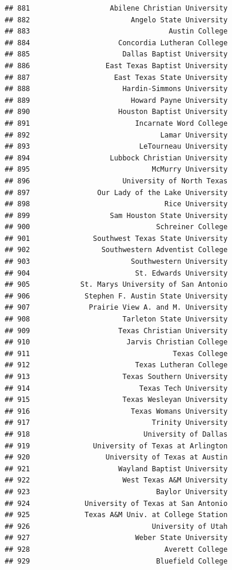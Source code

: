 \documentclass[]{article}
\begin{document}
\begin{verbatim}
## 881                   Abilene Christian University
## 882                        Angelo State University
## 883                                 Austin College
## 884                     Concordia Lutheran College
## 885                      Dallas Baptist University
## 886                  East Texas Baptist University
## 887                    East Texas State University
## 888                      Hardin-Simmons University
## 889                        Howard Payne University
## 890                     Houston Baptist University
## 891                         Incarnate Word College
## 892                               Lamar University
## 893                          LeTourneau University
## 894                   Lubbock Christian University
## 895                             McMurry University
## 896                      University of North Texas
## 897                Our Lady of the Lake University
## 898                                Rice University
## 899                   Sam Houston State University
## 900                              Schreiner College
## 901               Southwest Texas State University
## 902                 Southwestern Adventist College
## 903                        Southwestern University
## 904                         St. Edwards University
## 905            St. Marys University of San Antonio
## 906             Stephen F. Austin State University
## 907              Prairie View A. and M. University
## 908                      Tarleton State University
## 909                     Texas Christian University
## 910                       Jarvis Christian College
## 911                                  Texas College
## 912                         Texas Lutheran College
## 913                      Texas Southern University
## 914                          Texas Tech University
## 915                      Texas Wesleyan University
## 916                        Texas Womans University
## 917                             Trinity University
## 918                           University of Dallas
## 919               University of Texas at Arlington
## 920                  University of Texas at Austin
## 921                     Wayland Baptist University
## 922                      West Texas A&M University
## 923                              Baylor University
## 924             University of Texas at San Antonio
## 925             Texas A&M Univ. at College Station
## 926                             University of Utah
## 927                         Weber State University
## 928                                Averett College
## 929                              Bluefield College

\end{verbatim}
\end{document}
